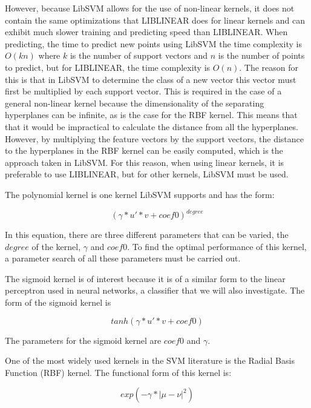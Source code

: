 \documentclass[12pt,oneside]{book}
\begin{document}
However, because LibSVM allows for the use of non-linear kernels, it
does not contain the same optimizations that LIBLINEAR does for linear
kernels and can exhibit much slower training and predicting speed than
LIBLINEAR.  When predicting, the time to predict new points using
LibSVM the time complexity is $O(kn)$ where $k$ is the number of
support vectors and $n$ is the number of points to predict, but for
LIBLINEAR, the time complexity is $O(n)$.  The reason for this is that
in LibSVM to determine the class of a new vector this vector must
first be multiplied by each support vector.  This is required in the
case of a general non-linear kernel because the dimensionality of the
separating hyperplanes can be infinite, as is the case for the RBF
kernel.  This means that that it would be impractical to calculate the
distance from all the hyperplanes.  However, by multiplying the
feature vectors by the support vectors, the distance to the
hyperplanes in the RBF kernel can be easily computed, which is the
approach taken in LibSVM.  For this reason, when using linear kernels,
it is preferable to use LIBLINEAR, but for other kernels, LibSVM must
be used.

The polynomial kernel is one kernel LibSVM supports and has the form:

\begin{equation} 
 (\gamma*u'*v + {coef0})^{degree}  
\end{equation}

In this equation, there are three different parameters that can be
varied, the $degree$ of the kernel, $\gamma$ and ${coef0}$.  To find the
optimal performance of this kernel, a parameter search of all these
parameters must be carried out.  

The sigmoid kernel is of interest because it is of a similar form to
the linear perceptron used in neural networks, a classifier that we
will also investigate.  The form of the sigmoid kernel is

\begin{equation} 
tanh(\gamma*u'*v + {coef0}) 
\end{equation}

The parameters for the sigmoid kernel are $coef0$ and $\gamma$. 

One of the most widely used kernels in the SVM literature
\cite{scholkopf97rbf} is the Radial Basis Function (RBF) kernel.  The
functional form of this kernel is:

\begin{equation} 
exp(-\gamma*|\mu-\nu|^2) 
\end{equation}
\end{document}
